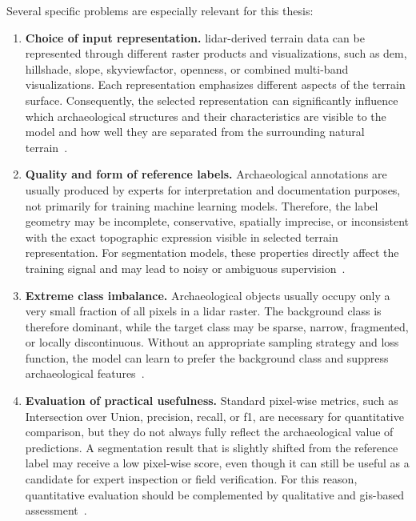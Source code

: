 Several specific problems are especially relevant for this thesis:
\begin{enumerate}
    \item \textbf{Choice of input representation.} \gls{lidar}-derived terrain data can be represented through different raster products and visualizations, such as \gls{dem}, \gls{hillshade}, \gls{slope}, \gls{skyviewfactor}, openness, or combined multi-band visualizations. Each representation emphasizes different aspects of the terrain surface. Consequently, the selected representation can significantly influence which archaeological structures and their characteristics are visible to the model and how well they are separated from the surrounding natural terrain~\cite{thompson_detecting_2020,kokalj_standardizing_2025}.

    \item \textbf{Quality and form of reference labels.} Archaeological annotations are usually produced by experts for interpretation and documentation purposes, not primarily for training machine learning models. Therefore, the label geometry may be incomplete, conservative, spatially imprecise, or inconsistent with the exact topographic expression visible in selected terrain representation. For segmentation models, these properties directly affect the training signal and may lead to noisy or ambiguous supervision~\cite{bundzel_semantic_2020,rahaman_effects_2022,burgert_effects_2022}.

    \item \textbf{Extreme class imbalance.} Archaeological objects usually occupy only a very small fraction of all pixels in a \gls{lidar} raster. The background class is therefore dominant, while the target class may be sparse, narrow, fragmented, or locally discontinuous. Without an appropriate sampling strategy and loss function, the model can learn to prefer the background class and suppress archaeological features~\cite{diakogiannis_resunet-_2020,zhou_dynamic_2023}.

    \item \textbf{Evaluation of practical usefulness.} Standard pixel-wise metrics, such as Intersection over Union, precision, recall, or \gls{f1}, are necessary for quantitative comparison, but they do not always fully reflect the archaeological value of predictions. A segmentation result that is slightly shifted from the reference label may receive a low pixel-wise score, even though it can still be useful as a candidate for expert inspection or field verification. For this reason, quantitative evaluation should be complemented by qualitative and \gls{gis}-based assessment~\cite{fiorucci_deep_2022,guyot_objective_2021}.
\end{enumerate}

